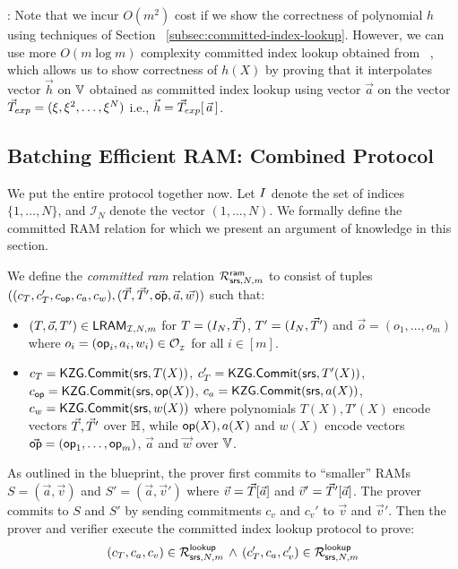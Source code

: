 : Note that we incur $O(m^2)$ cost if we show the correctness of polynomial $h$ using techniques of Section ~\ref{subsec:committed-index-lookup}.
However, we can use more $O(m\log m)$ complexity committed index lookup obtained from ~\cite{EPRINT:EagFioGab22}, which allows us to show correctness of
$h(X)$ by proving that it interpolates vector $\vec{h}$ on $\mathbb{V}$ obtained as committed index lookup using vector $\vec{a}$ on the vector $\vec{T}_{exp}=(\xi,\xi^2,\ldots,\xi^N)$
i.e., $\vec{h}=\vec{T}_{exp}[\, \vec{a}\,]$.

\subsection{Batching Efficient RAM: Combined Protocol}\label{subsec:all-together}
We put the entire protocol together now. Let $I$ denote the set of indices $\{1,\ldots,N\}$, and $\mathcal{I}_N$
denote the vector $(1,\ldots,N)$. We formally define the committed RAM relation for which we present an argument of
knowledge in this section.
\begin{definition}\label{defn:committed-ram}
We define the {\em committed ram} relation
$\mathcal{R}^{\mathsf{ram}}_{\mathsf{srs},N,m}$ to consist of tuples $((c_T, c_T', c_{\mathsf{op}}, c_a, c_w),(\vec{T}, \vec{T}',\vec{\mathsf{op}},\vec{a},\vec{w}))$
such that:
\begin{itemize}[leftmargin=1em]
    \item $(T,\vec{o},T')\in \mathsf{LRAM}_{\mathcal{I},N,m}$ for $T=(I_N,\vec{T})$, $T'=(I_N,\vec{T}')$ and $\vec{o}=(o_1,\ldots,o_m)$
    where $o_i=(\mathsf{op}_i, a_i, w_i)\in \mathcal{O}_{{}_\mathcal{I}}$ for all $i\in [m]$.
    \item $c_T=\mathsf{KZG.Commit}(\mathsf{srs}, T(X))$, $c_T'=\mathsf{KZG.Commit}(\mathsf{srs}, T'(X))$, $c_{\mathsf{op}} = \mathsf{KZG.Commit}(\mathsf{srs},\mathsf{op}(X))$,  $c_a=\mathsf{KZG.Commit}(\mathsf{srs}, a(X))$,
    $c_w = \mathsf{KZG.Commit}(\mathsf{srs}, w(X))$ where polynomials $T(X), T'(X)$ encode vectors $\vec{T}, \vec{T}'$ over $\mathbb{H}$, while $\mathsf{op}(X), a(X)$ and
    $w(X)$ encode vectors $\vec{\mathsf{op}}=(\mathsf{op}_1,\ldots,\mathsf{op}_m)$, $\vec{a}$ and $\vec{w}$ over $\mathbb{V}$.
\end{itemize}
\end{definition}
As outlined in the blueprint, the prover first commits to ``smaller'' RAMs $S=(\vec{a},\vec{v})$ and $S'=(\vec{a},\vec{v}')$
where $\vec{v}=\vec{T}[\vec{a}]$ and $\vec{v}'=\vec{T}'[\vec{a}]$. The prover commits to $S$ and $S'$ by sending commitments
$c_v$ and $c_v'$ to $\vec{v}$ and $\vec{v}'$. Then the prover and verifier execute the committed index lookup protocol to
prove:
\begin{equation}
(c_T, c_a, c_v)\in \mathcal{R}^{\mathsf{lookup}}_{\mathsf{srs},N,m}\, \wedge\, (c_T', c_a, c_v')\in \mathcal{R}^{\mathsf{lookup}}_{\mathsf{srs},N,m}
\end{equation}
